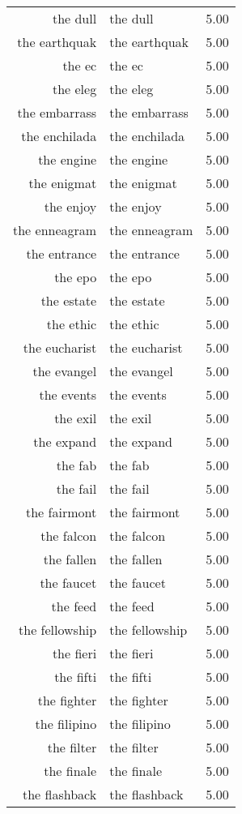 \begin{table}[ht]
\begin{tabular}{rlr}
  the dull & the dull & 5.00 \\ 
  the earthquak & the earthquak & 5.00 \\ 
  the ec & the ec & 5.00 \\ 
  the eleg & the eleg & 5.00 \\ 
  the embarrass & the embarrass & 5.00 \\ 
  the enchilada & the enchilada & 5.00 \\ 
  the engine & the engine & 5.00 \\ 
  the enigmat & the enigmat & 5.00 \\ 
  the enjoy & the enjoy & 5.00 \\ 
  the enneagram & the enneagram & 5.00 \\ 
  the entrance & the entrance & 5.00 \\ 
  the epo & the epo & 5.00 \\ 
  the estate & the estate & 5.00 \\ 
  the ethic & the ethic & 5.00 \\ 
  the eucharist & the eucharist & 5.00 \\ 
  the evangel & the evangel & 5.00 \\ 
  the events & the events & 5.00 \\ 
  the exil & the exil & 5.00 \\ 
  the expand & the expand & 5.00 \\ 
  the fab & the fab & 5.00 \\ 
  the fail & the fail & 5.00 \\ 
  the fairmont & the fairmont & 5.00 \\ 
  the falcon & the falcon & 5.00 \\ 
  the fallen & the fallen & 5.00 \\ 
  the faucet & the faucet & 5.00 \\ 
  the feed & the feed & 5.00 \\ 
  the fellowship & the fellowship & 5.00 \\ 
  the fieri & the fieri & 5.00 \\ 
  the fifti & the fifti & 5.00 \\ 
  the fighter & the fighter & 5.00 \\ 
  the filipino & the filipino & 5.00 \\ 
  the filter & the filter & 5.00 \\ 
  the finale & the finale & 5.00 \\ 
  the flashback & the flashback & 5.00 \\ 

\end{tabular}
\end{table}
